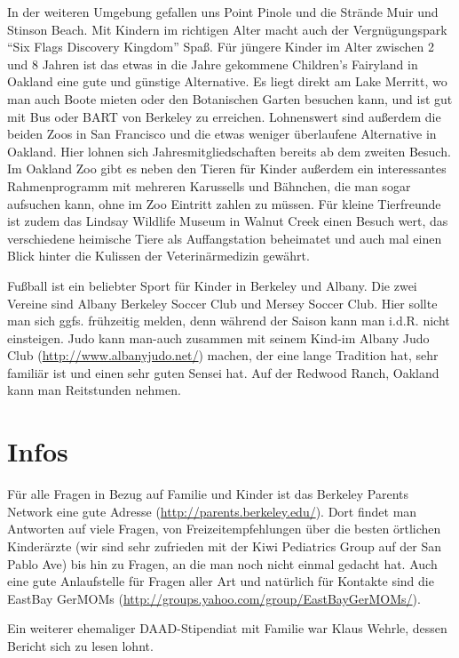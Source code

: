 \documentclass[a4paper]{scrreprt}
\begin{document}
In der weiteren Umgebung gefallen uns Point Pinole und die Strände Muir und Stinson Beach. Mit Kindern im richtigen Alter macht auch der Vergnügungspark "`Six Flags Discovery Kingdom"' Spaß.
Für jüngere Kinder im Alter zwischen 2 und 8 Jahren ist das etwas in die Jahre gekommene Children's Fairyland in Oakland eine gute und günstige Alternative. Es liegt direkt am Lake Merritt, wo man auch Boote mieten oder den Botanischen Garten besuchen kann, und ist gut mit Bus oder BART von Berkeley zu erreichen.
Lohnenswert sind außerdem die beiden Zoos in San Francisco und die etwas weniger überlaufene Alternative in Oakland. Hier lohnen sich Jahresmitgliedschaften bereits ab dem zweiten Besuch. Im Oakland Zoo gibt es neben den Tieren für Kinder außerdem ein interessantes Rahmenprogramm mit mehreren Karussells und Bähnchen, die man sogar aufsuchen kann, ohne im Zoo Eintritt zahlen zu müssen. Für kleine Tierfreunde ist zudem das Lindsay Wildlife Museum in Walnut Creek einen Besuch wert, das verschiedene heimische Tiere als Auffangstation beheimatet und auch mal einen Blick hinter die Kulissen der Veterinärmedizin gewährt.

Fußball ist ein beliebter Sport für Kinder in Berkeley und Albany. Die zwei Vereine sind Albany Berkeley Soccer Club und Mersey Soccer Club. Hier sollte man sich ggfs. frühzeitig melden, denn während der Saison kann man i.d.R. nicht einsteigen. Judo kann man-auch zusammen mit seinem Kind-im Albany Judo Club (\url{http://www.albanyjudo.net/}) machen, der eine lange Tradition hat, sehr familiär ist und einen sehr guten Sensei hat. Auf der Redwood Ranch, Oakland kann man Reitstunden nehmen.

\section{Infos}

Für alle Fragen in Bezug auf Familie und Kinder ist das Berkeley Parents Network eine gute Adresse (\url{http://parents.berkeley.edu/}). Dort findet man Antworten auf viele Fragen, von Freizeitempfehlungen über die besten örtlichen Kinderärzte (wir sind sehr zufrieden mit der Kiwi Pediatrics Group auf der San Pablo Ave) bis hin zu Fragen, an die man noch nicht einmal gedacht hat. Auch eine gute Anlaufstelle für Fragen aller Art und natürlich für Kontakte sind die EastBay GerMOMs (\url{http://groups.yahoo.com/group/EastBayGerMOMs/}).

Ein weiterer ehemaliger DAAD-Stipendiat mit Familie war Klaus Wehrle, dessen Bericht sich zu lesen lohnt.
\end{document}
